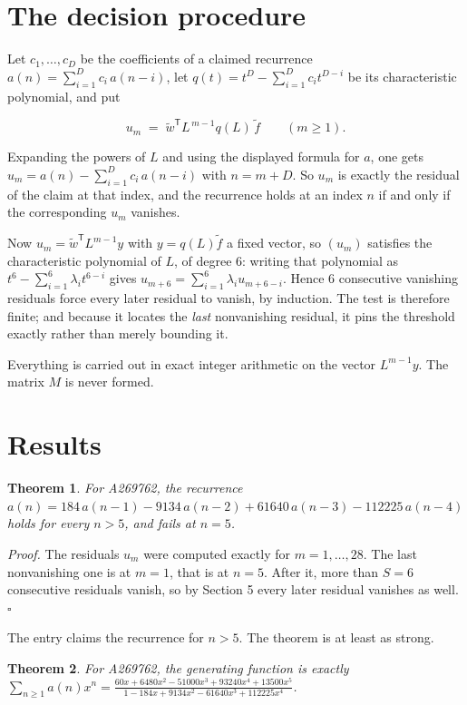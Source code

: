 \documentclass[11pt]{article}
\newtheorem{theorem}{Theorem}
\theoremstyle{definition}
\begin{document}
\section{The decision procedure}

Let $c_1,\dots,c_D$ be the coefficients of a claimed recurrence $a(n) = \sum_{i=1}^{D} c_i\,a(n-i)$, let $q(t) = t^{D} - \sum_{i=1}^{D} c_i t^{D-i}$ be its characteristic polynomial, and put

\[u_m \;=\; \tilde w^{\mathsf T} L^{\,m-1} q(L)\,\tilde f \qquad (m \ge 1).\]

Expanding the powers of $L$ and using the displayed formula for $a$, one gets $u_m = a(n) - \sum_{i=1}^{D} c_i\,a(n-i)$ with $n = m + D$. So $u_m$ is exactly the residual of the claim at that index, and the recurrence holds at an index $n$ if and only if the corresponding $u_m$ vanishes.

Now $u_m = \tilde w^{\mathsf T} L^{m-1} y$ with $y = q(L)\tilde f$ a fixed vector, so $(u_m)$ satisfies the characteristic polynomial of $L$, of degree $6$: writing that polynomial as $t^{6} - \sum_{i=1}^{6} \lambda_i t^{6-i}$ gives $u_{m+6} = \sum_{i=1}^{6} \lambda_i u_{m+6-i}$. Hence $6$ consecutive vanishing residuals force every later residual to vanish, by induction. The test is therefore finite; and because it locates the {\itshape last} nonvanishing residual, it pins the threshold exactly rather than merely bounding it.

Everything is carried out in exact integer arithmetic on the vector $L^{m-1}y$. The matrix $M$ is never formed.

\section{Results}

\begin{theorem} For A269762, the recurrence $a(n) = 184\,a(n-1) - 9134\,a(n-2) + 61640\,a(n-3) - 112225\,a(n-4)$ holds for every $n > 5$, and fails at $n = 5$.\end{theorem}

{\itshape Proof.} The residuals $u_m$ were computed exactly for $m = 1,\dots,28$. The last nonvanishing one is at $m = 1$, that is at $n = 5$. After it, more than $S = 6$ consecutive residuals vanish, so by Section 5 every later residual vanishes as well. $\square$

The entry claims the recurrence for $n > 5$. The theorem is at least as strong.

\begin{theorem} For A269762, the generating function is exactly $\sum_{n\ge 1} a(n)x^n = \frac{60x + 6480x^{2} - 51000x^{3} + 93240x^{4} + 13500x^{5}}{1 - 184x + 9134x^{2} - 61640x^{3} + 112225x^{4}}$.\end{theorem}
\end{document}
